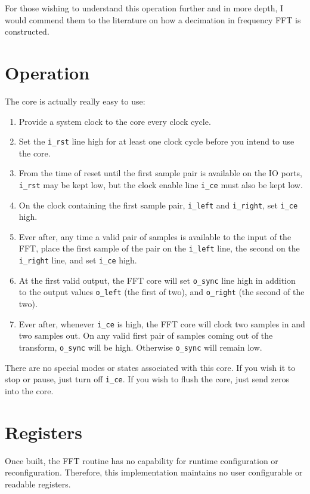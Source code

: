 \documentclass{gqtekspec}
\begin{document}
For those wishing to understand this operation further and in more depth, I
would commend them to the literature on how a decimation in frequency FFT is
constructed.

\chapter{Operation}

The core is actually really easy to use:
\begin{enumerate}
	\item Provide a system clock to the core every clock cycle.
	\item Set the {\tt i\_rst} line high for at least one clock cycle
		before you intend to use the core.
	\item From the time of reset until the first sample pair is available
		on the IO ports, {\tt i\_rst} may be kept low, but the clock
		enable line {\tt i\_ce} must also be kept low.
	\item On the clock containing the first sample pair, {\tt i\_left}
		and {\tt i\_right}, set {\tt i\_ce} high.
	\item Ever after, any time a valid pair of samples is available to
		the input of the FFT, place the first sample of the pair
		on the {\tt i\_left} line, the second on the {\tt i\_right}
		line, and set {\tt i\_ce} high.
	\item At the first valid output, the FFT core will set {\tt o\_sync}
		line high in addition to the output values {\tt o\_left}
		(the first of two), and {\tt o\_right} (the second of the two).
	\item Ever after, whenever {\tt i\_ce} is high, the FFT core will clock
		two samples in and two samples out.  On any valid first
		pair of samples coming out of the transform,
		{\tt o\_sync} will be high.  Otherwise {\tt o\_sync} will
		remain low.
\end{enumerate}

There are no special modes or states associated with this core.  If you wish
it to stop or pause, just turn off {\tt i\_ce}.  If you wish to flush the
core, just send zeros into the core.

\chapter{Registers}

Once built, the FFT routine has no capability for runtime configuration
or reconfiguration.  Therefore, this implementation maintains no user
configurable or readable registers.
\end{document}

